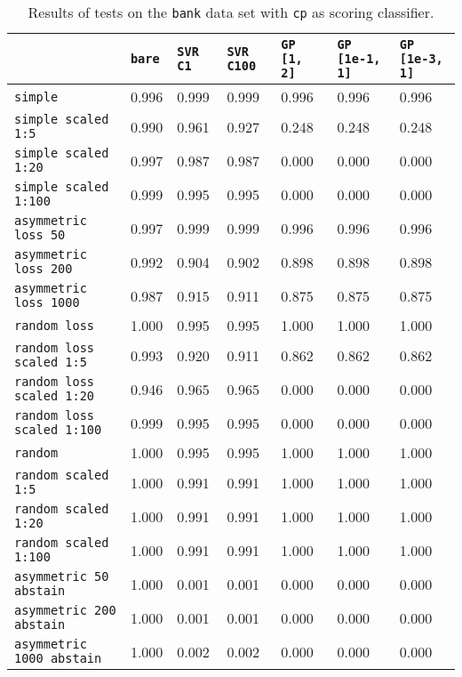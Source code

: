 \begin{table}
{\scriptsize
\begin{tabu}{l|l|l|l|l|l|l}
&\texttt{bare} &\texttt{SVR C1} &\texttt{SVR C100} &\texttt{GP [1, 2]} &\texttt{GP [1e-1, 1]} &\texttt{GP [1e-3, 1]}  \\
\hline
\texttt{simple} &0.996 &0.999 &0.999 &0.996 &0.996 &0.996 \\
\texttt{simple scaled 1:5} &0.990 &0.961 &0.927 &0.248 &0.248 &0.248 \\
\texttt{simple scaled 1:20} &0.997 &0.987 &0.987 &0.000 &0.000 &0.000 \\
\texttt{simple scaled 1:100} &0.999 &0.995 &0.995 &0.000 &0.000 &0.000 \\
\texttt{asymmetric loss 50} &0.997 &0.999 &0.999 &0.996 &0.996 &0.996 \\
\texttt{asymmetric loss 200} &0.992 &0.904 &0.902 &0.898 &0.898 &0.898 \\
\texttt{asymmetric loss 1000} &0.987 &0.915 &0.911 &0.875 &0.875 &0.875 \\
\texttt{random loss} &1.000 &0.995 &0.995 &1.000 &1.000 &1.000 \\
\texttt{random loss scaled 1:5} &0.993 &0.920 &0.911 &0.862 &0.862 &0.862 \\
\texttt{random loss scaled 1:20} &0.946 &0.965 &0.965 &0.000 &0.000 &0.000 \\
\texttt{random loss scaled 1:100} &0.999 &0.995 &0.995 &0.000 &0.000 &0.000 \\
\texttt{random} &1.000 &0.995 &0.995 &1.000 &1.000 &1.000 \\
\texttt{random scaled 1:5} &1.000 &0.991 &0.991 &1.000 &1.000 &1.000 \\
\texttt{random scaled 1:20} &1.000 &0.991 &0.991 &1.000 &1.000 &1.000 \\
\texttt{random scaled 1:100} &1.000 &0.991 &0.991 &1.000 &1.000 &1.000 \\
\texttt{asymmetric 50 abstain} &1.000 &0.001 &0.001 &0.000 &0.000 &0.000 \\
\texttt{asymmetric 200 abstain} &1.000 &0.001 &0.001 &0.000 &0.000 &0.000 \\
\texttt{asymmetric 1000 abstain} &1.000 &0.002 &0.002 &0.000 &0.000 &0.000 \\
\end{tabu} }
\caption{Results of tests on the \texttt{bank} data set
         with \texttt{cp} as scoring classifier.}
\end{table}

